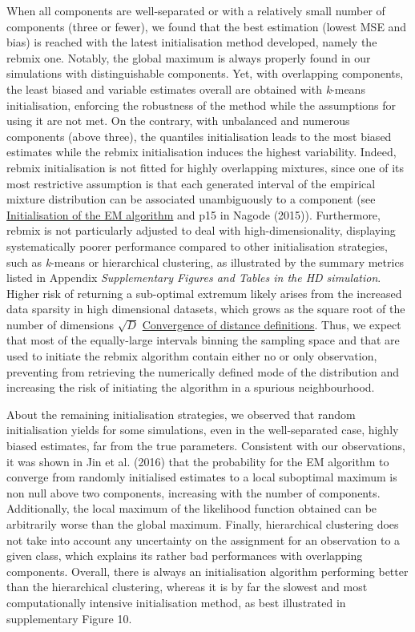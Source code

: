 When all components are well-separated or with a relatively small number of components (three or fewer), we found that the best
estimation (lowest MSE and bias) is reached with the latest initialisation method developed, namely the rebmix one. Notably, the global maximum is always properly found in our simulations with distinguishable components. Yet, with overlapping components, the least biased and variable estimates overall are obtained with \emph{k}-means initialisation, enforcing the robustness of the method while the assumptions for using it are not met. On the contrary, with unbalanced and numerous components (above three), the quantiles initialisation leads to the most biased estimates while the rebmix initialisation induces the highest variability. Indeed, rebmix initialisation is not fitted for highly overlapping mixtures, since one of its most restrictive assumption is that each generated interval of the empirical mixture distribution can be associated unambiguously to a component (see \protect\hyperlink{initialisation-of-the-em-algorithm}{Initialisation of the EM algorithm} and p15 in Nagode (2015)). Furthermore, rebmix is not particularly adjusted to deal with high-dimensionality, displaying systematically poorer performance compared to other initialisation strategies, such as \emph{k}-means or hierarchical clustering, as illustrated by the summary metrics listed in Appendix \emph{Supplementary Figures and Tables in the HD simulation}. Higher risk of returning a sub-optimal extremum likely arises from the increased data sparsity in high dimensional datasets, which grows as the square root of the number of dimensions \(\sqrt{D}\) \href{https://en.wikipedia.org/wiki/Curse_of_dimensionality\#Distance_function}{Convergence of distance definitions}. Thus, we expect that most of the equally-large intervals binning the sampling space and that are used to initiate the rebmix algorithm contain either no or only observation, preventing from retrieving the numerically defined mode of the distribution and increasing the risk of initiating the algorithm in a spurious neighbourhood.

About the remaining initialisation strategies, we observed that random initialisation yields for some simulations, even in the well-separated case, highly biased estimates, far from the true
parameters. Consistent with our observations, it was shown in
Jin et al. (2016) that the probability for the EM algorithm to converge from
randomly initialised estimates to a local suboptimal maximum is non null above two
components, increasing with the number of components. Additionally, the
local maximum of the likelihood function obtained can be arbitrarily
worse than the global maximum. Finally, hierarchical clustering does not
take into account any uncertainty on the assignment for an observation
to a given class, which explains its rather bad performances with
overlapping components. Overall, there is always an initialisation
algorithm performing better than the hierarchical clustering, whereas it
is by far the slowest and most computationally intensive initialisation
method, as best illustrated in supplementary Figure 10.

